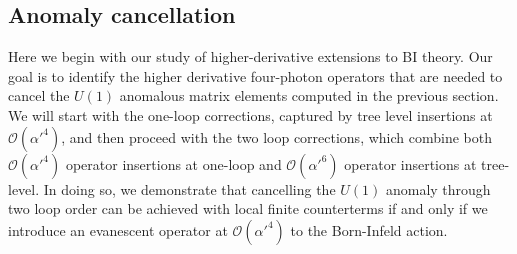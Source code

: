 \documentclass[11pt,letter]{article}
\begin{document}
\subsection{Anomaly cancellation}\label{sec:Anomalies}
Here we begin with our study of higher-derivative extensions to BI theory. Our goal is to identify the higher derivative four-photon operators that are needed to cancel the $U(1)$ anomalous matrix elements computed in the previous section. We will start with the one-loop corrections, captured by tree level insertions at $\mathcal{O}(\alpha'^4)$, and then proceed with the two loop corrections, which combine both $\mathcal{O}(\alpha'^4)$ operator insertions at one-loop and $\mathcal{O}(\alpha'^6)$ operator insertions at tree-level. In doing so, we demonstrate that cancelling the $U(1)$ anomaly through two loop order can be achieved with local finite counterterms if and only if we introduce an evanescent operator at $\mathcal{O}(\alpha'^4)$ to the Born-Infeld action. 
\end{document}

